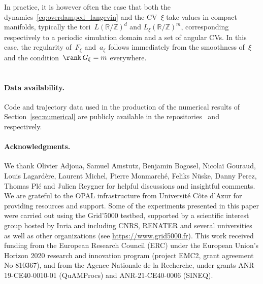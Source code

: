 \documentclass[a4]{article}
\newcommand{\1}{\mathbbm 1}
\begin{document}
        In practice, it is however often the case that both the dynamics~\eqref{eq:overdamped_langevin} and the CV~$\xi$ take values in compact manifolds, typically the tori~$L(\mathbb R/\mathbb Z)^d$ and $L_\xi(\mathbb R/\mathbb Z)^m$, corresponding respectively to a periodic simulation domain and a set of angular CVs.
        In this case, the regularity of~$F_\xi$ and~$a_\xi$ follows immediately from the smoothness of~$\xi$ and the condition~$\rank\,G_\xi=m$ everywhere.
\section*{}
\paragraph{Data availability.}
Code and trajectory data used in the production of the numerical results of Section~\ref{sec:numerical} are publicly available in the repositories~\cite{github} and~\cite{data} respectively.
\paragraph{Acknowledgments.}
    We thank Olivier Adjoua, Samuel Amstutz, Benjamin Bogosel, Nicola\"i Gouraud, Louis Lagard\`ere, Laurent Michel, Pierre Monmarch\'e, Feliks N\"uske, Danny Perez, Thomas Pl\'e and Julien Reygner for helpful discussions and insightful comments.
    We are grateful to the OPAL infrastructure from Universit\'e C\^ote d'Azur for providing resources and support.
    Some of the experiments presented in this paper were carried out using the Grid'5000 testbed, supported by a scientific interest group hosted by Inria and including CNRS, RENATER and several universities as well as other organizations (see \url{https://www.grid5000.fr}).
    This work received funding from the European Research Council (ERC) under the
    European Union's Horizon 2020 research and innovation program (project
    EMC2, grant agreement No 810367), and from the Agence Nationale de la
    Recherche, under grants ANR-19-CE40-0010-01 (QuAMProcs) and
    ANR-21-CE40-0006 (SINEQ).



\end{document}
